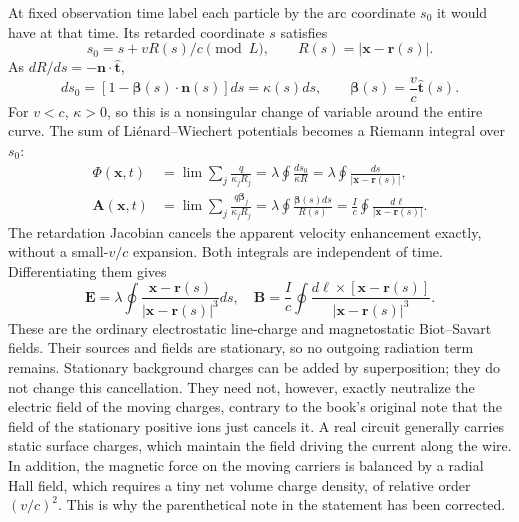 At fixed observation time label each particle by the arc coordinate
$s_0$ it would have at that time. Its retarded coordinate $s$ satisfies
\[
s_0=s+vR(s)/c\pmod L,
\qquad R(s)=|\mathbf x-\mathbf r(s)|.
\]
As $dR/ds=-\mathbf n\cdot\hat{\mathbf t}$,
\[
\boxed{ds_0=[1-\boldsymbol\beta(s)\cdot\mathbf n(s)]ds
=\kappa(s)ds,\qquad
\boldsymbol\beta(s)=\frac vc\hat{\mathbf t}(s).}
\]
For $v<c$, $\kappa>0$, so this is a nonsingular change of variable
around the entire curve. The sum of Li\'enard--Wiechert potentials
becomes a Riemann integral over $s_0$:
\begin{align*}
\Phi(\mathbf x,t)&=\lim\sum_j\frac q{\kappa_jR_j}
=\lambda\oint\frac{ds_0}{\kappa R}
=\boxed{\lambda\oint\frac{ds}{|\mathbf x-\mathbf r(s)|}},\\
\mathbf A(\mathbf x,t)&=\lim\sum_j\frac{q\boldsymbol\beta_j}{\kappa_jR_j}
=\lambda\oint\frac{\boldsymbol\beta(s)ds}{R(s)}
=\boxed{\frac Ic\oint\frac{d\boldsymbol\ell}{|\mathbf x-\mathbf r(s)|}}.
\end{align*}
The retardation Jacobian cancels the apparent velocity enhancement
exactly, without a small-$v/c$ expansion. Both integrals are independent
of time. Differentiating them gives
\[
\boxed{\mathbf E=\lambda\oint
\frac{\mathbf x-\mathbf r(s)}{|\mathbf x-\mathbf r(s)|^3}ds,
\quad
\mathbf B=\frac Ic\oint
\frac{d\boldsymbol\ell\times[\mathbf x-\mathbf r(s)]}
{|\mathbf x-\mathbf r(s)|^3}.}
\]
These are the ordinary electrostatic line-charge and magnetostatic
Biot--Savart fields. Their sources and fields are stationary, so no
outgoing radiation term remains. Stationary background charges can be
added by superposition; they do not change this cancellation.
They need not, however, exactly neutralize the electric field of the
moving charges, contrary to the book's original note that the field of
the stationary positive ions just cancels it.
A real circuit generally carries static surface charges, which maintain
the field driving the current along the wire. In addition, the magnetic
force on the moving carriers is balanced by a radial Hall field, which
requires a tiny net volume charge density, of relative order $(v/c)^2$.
This is why the parenthetical note in the statement has been corrected.


